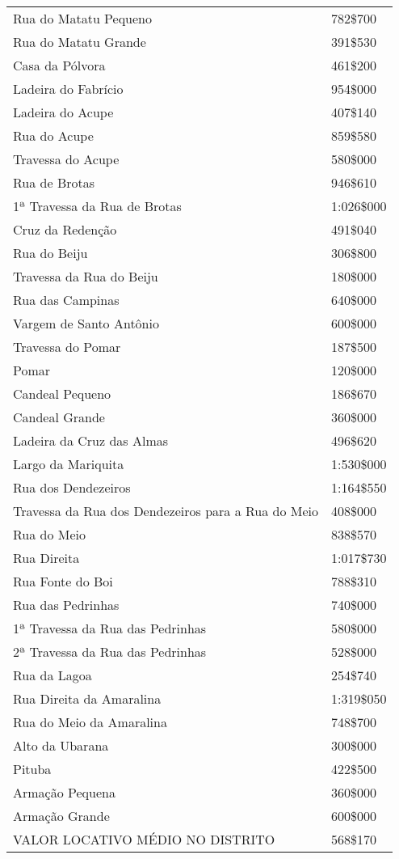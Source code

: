 \begin{table}[!htp]
{\begin{tiny}
\begin{tabular}{ll}
Rua do Matatu Pequeno	&782\$700\\
Rua do Matatu Grande	&391\$530\\
Casa da Pólvora	&461\$200\\
Ladeira do Fabrício	&954\$000\\
Ladeira do Acupe	&407\$140\\
Rua do Acupe	&859\$580\\
Travessa do Acupe	&580\$000\\
Rua de Brotas	&946\$610\\
1ª Travessa da Rua de Brotas	&1:026\$000\\
Cruz da Redenção	&491\$040\\
Rua do Beiju	&306\$800\\
Travessa da Rua do Beiju	&180\$000\\
Rua das Campinas	&640\$000\\
Vargem de Santo Antônio	&600\$000\\
Travessa do Pomar	&187\$500\\
Pomar	&120\$000\\
Candeal Pequeno	&186\$670\\
Candeal Grande	&360\$000\\
Ladeira da Cruz das Almas	&496\$620\\
Largo da Mariquita	&1:530\$000\\
Rua dos Dendezeiros	&1:164\$550\\
Travessa da Rua dos Dendezeiros para a Rua do Meio	&408\$000\\
Rua do Meio	&838\$570\\
Rua Direita	&1:017\$730\\
Rua Fonte do Boi	&788\$310\\
Rua das Pedrinhas	&740\$000\\
1ª Travessa da Rua das Pedrinhas	&580\$000\\
2ª Travessa da Rua das Pedrinhas	&528\$000\\
Rua da Lagoa	&254\$740\\
Rua Direita da Amaralina	&1:319\$050\\
Rua do Meio da Amaralina	&748\$700\\
Alto da Ubarana	&300\$000\\
Pituba	&422\$500\\
Armação Pequena	&360\$000\\
Armação Grande	&600\$000\\
\midrule
VALOR LOCATIVO MÉDIO NO DISTRITO	&568\$170\\
\bottomrule
\end{tabular} 
\end{tiny}
}
{}
\end{table}
